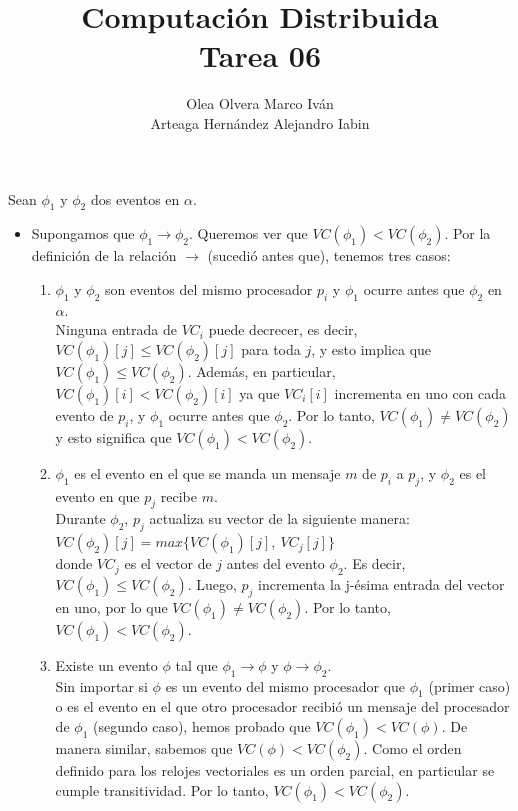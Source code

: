\documentclass{article}
\title{Computación Distribuida \\ Tarea 06}
\author{Olea Olvera Marco Iván \\ Arteaga Hernández Alejandro Iabin}
\date{}
\begin{document}
\maketitle

\section{}

Sean $\phi_1$ y $\phi_2$ dos eventos en $\alpha$.

\begin{itemize}

    \item Supongamos que $\phi_1 \rightarrow \phi_2$. Queremos ver que $VC(\phi_1) < VC(\phi_2)$. Por la definición de la relación $\rightarrow$ (sucedió antes que), tenemos tres casos:
    \begin{enumerate}
        \item $\phi_1$ y $\phi_2$ son eventos del mismo procesador $p_i$ y $\phi_1$ ocurre antes que $\phi_2$ en $\alpha$. \\
        Ninguna entrada de $VC_i$ puede decrecer, es decir, $VC(\phi_1)[j] \leq VC(\phi_2)[j]$ para toda $j$, y esto implica que $VC(\phi_1) \leq VC(\phi_2)$. Además, en particular, $VC(\phi_1)[i] < VC(\phi_2)[i]$ ya que $VC_i[i]$ incrementa en uno con cada evento de $p_i$, y $\phi_1$ ocurre antes que $\phi_2$. Por lo tanto, $VC(\phi_1) \not= VC(\phi_2)$ y esto significa que $VC(\phi_1) < VC(\phi_2)$.
        \item $\phi_1$ es el evento en el que se manda un mensaje $m$ de $p_i$ a $p_j$, y $\phi_2$ es el evento en que $p_j$ recibe $m$. \\
        Durante $\phi_2$, $p_j$ actualiza su vector de la siguiente manera: \\
        $VC(\phi_2)[j] = max\{VC(\phi_1)[j],\ VC_j[j]\}$ \\
        donde $VC_j$ es el vector de $j$ antes del evento $\phi_2$. Es decir, $VC(\phi_1) \leq VC(\phi_2)$. Luego, $p_j$ incrementa la j-ésima entrada del vector en uno, por lo que $VC(\phi_1) \not= VC(\phi_2)$. Por lo tanto, $VC(\phi_1) < VC(\phi_2)$.
        \item Existe un evento $\phi$ tal que $\phi_1 \rightarrow \phi$ y $\phi \rightarrow \phi_2$. \\
        Sin importar si $\phi$ es un evento del mismo procesador que $\phi_1$ (primer caso) o es el evento en el que otro procesador recibió un mensaje del procesador de $\phi_1$ (segundo caso), hemos probado que $VC(\phi_1) < VC(\phi)$. De manera similar, sabemos que $VC(\phi) < VC(\phi_2)$. Como el orden definido para los relojes vectoriales es un orden parcial, en particular se cumple transitividad. Por lo tanto, $VC(\phi_1) < VC(\phi_2)$.
    \end{enumerate}
    

\end{itemize}
\end{document}
